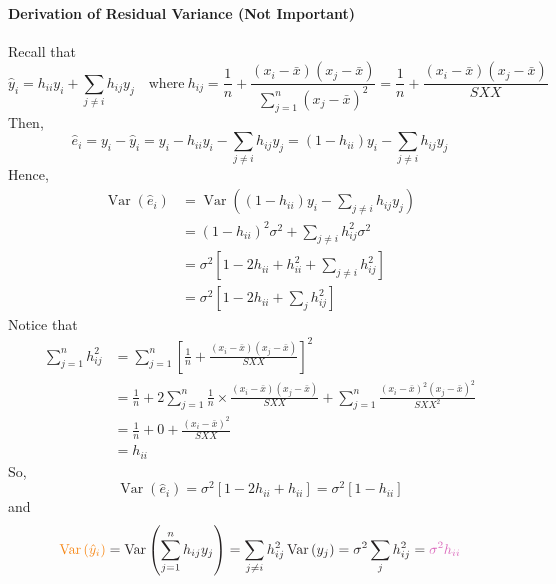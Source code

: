 \documentclass[11pt]{article}
\begin{document}
\paragraph{Derivation of Residual Variance (Not Important)}
Recall that
\begin{equation*}
    \hat{y}_{i}=h_{i i} y_{i}+\sum_{j \neq i} h_{i j} y_{j} \quad \text{where}~h_{i j}=\frac{1}{n}+\frac{\left(x_{i}-\bar{x}\right)\left(x_{j}-\bar{x}\right)}{\sum_{j=1}^{n}\left(x_{j}-\bar{x}\right)^{2}}=\frac{1}{n}+\frac{\left(x_{i}-\bar{x}\right)\left(x_{j}-\bar{x}\right)}{S X X}
\end{equation*}
Then,
\begin{equation*}
    \hat{e}_{i}=y_{i}-\hat{y}_{i}=y_{i}-h_{i i} y_{i}-\sum_{j \neq i} h_{i j} y_{j}=\left(1-h_{i i}\right) y_{i}-\sum_{j \neq i} h_{i j} y_{j}
\end{equation*}
Hence,
\begin{align*}
    \operatorname{Var}\left(\hat{e}_{i}\right) &= \operatorname{Var}\left(\left(1-h_{i i}\right) y_{i}-\sum_{j \neq i} h_{i j} y_{j}\right) \\
    &= \left(1-h_{i i}\right)^{2} \sigma^{2}+\sum_{j \neq i} h_{i j}^{2} \sigma^{2} \\
    &= \sigma^{2}\left[1-2 h_{i i}+h_{i i}^{2}+\sum_{j \neq i} h_{i j}^{2}\right] \\
    &=\sigma^{2}\left[1-2 h_{i i}+\sum_{j} h_{i j}^{2}\right]
\end{align*}
Notice that 
\begin{align*} 
    \sum_{j=1}^{n} h_{i j}^{2} &=\sum_{j=1}^{n}\left[\frac{1}{n}+\frac{\left(x_{i}-\bar{x}\right)\left(x_{j}-\bar{x}\right)}{S X X}\right]^{2} \\ &=\frac{1}{n}+2 \sum_{j=1}^{n} \frac{1}{n} \times \frac{\left(x_{i}-\bar{x}\right)\left(x_{j}-\bar{x}\right)}{S X X}+\sum_{j=1}^{n} \frac{\left(x_{i}-\bar{x}\right)^{2}\left(x_{j}-\bar{x}\right)^{2}}{S X X^{2}} \\ &=\frac{1}{n}+0+\frac{\left(x_{i}-\bar{x}\right)^{2}}{S X X} \\ &=h_{i i} 
\end{align*}
So,
\begin{equation*}
    \operatorname{Var}\left(\hat{e}_{i}\right)=\sigma^{2}\left[1-2 h_{i i}+h_{i i}\right]=\sigma^{2}\left[1-h_{i i}\right]
\end{equation*}
and
\begin{equation*}
    \color{BurntOrange}{\operatorname{Var}\left(\hat{y}_{i}\right)} \color{Black}=\operatorname{Var}\left(\sum_{j=1}^{n} h_{i j} y_{j}\right)=\sum_{j \neq i} h_{i j}^{2} \operatorname{Var}\left(y_{j}\right)=\sigma^{2} \sum_{j} h_{i j}^{2}=\color{Thistle}{\sigma^{2} h_{i i}}
\end{equation*}
\end{document}
